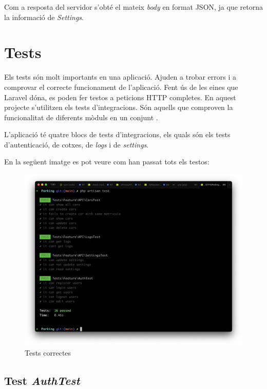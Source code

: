 Com a resposta del servidor s'obté el mateix \emph{body} en format JSON, ja que
retorna la informació de \emph{Settings}.

\section{Tests}

Els tests són molt importants en una aplicació. Ajuden a trobar errors i a comprovar el correcte funcionament de l'aplicació.
Fent ús de les eines que Laravel dóna, es poden fer testos a peticions HTTP completes. En aquest projecte s'utilitzen
els tests d'integracions. Són aquells que comproven la funcionalitat de diferents mòduls en un conjunt \autocite{testing_laravel}.

L'aplicació té quatre blocs de tests d'integracions, els quals són els tests d'autenticació, de cotxes, de \emph{logs} i de \emph{settings}.

En la següent imatge es pot veure com han passat tots els testos:

\begin{figure}[H]
    \begin{center}
    \includegraphics[scale=0.40]{Fotos/testsComprovacio.png}
    \end{center}
    \caption{Tests correctes}
    \label{fig:register_photo}
\end{figure}

\subsection{Test \emph{AuthTest}}

